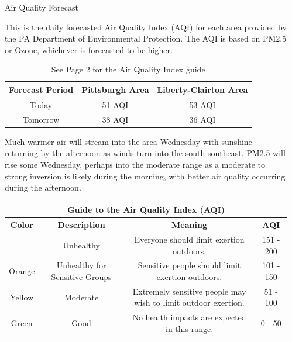 \documentclass[final]{beamer}
\newlength{\sepwidth}
\newlength{\colwidth}
\newcommand{\separatorcolumn}{\begin{column}{\sepwidth}\end{column}}
\begin{document}
\begin{frame}[t]
\begin{columns}[t]
\separatorcolumn

\begin{column}{\colwidth}

  \begin{block}{Air Quality Forecast}

    This is the daily forecasted Air Quality Index (AQI) for each area provided by the PA Department of Environmental Protection. The AQI is based on PM2.5 or Ozone, whichever is forecasted to be higher.

    \begin{table}
      \renewcommand{\arraystretch}{1.5}
      \centering
      \begin{tabular}{|c| c| c|}
        \hline
        \textbf{Forecast Period} & \textbf{Pittsburgh Area} & \textbf{Liberty-Clairton Area} \\
        \hline
        Today & 51 AQI & 53 AQI \\
        \hline
        Tomorrow & 38 AQI & 36 AQI \\
        \hline
      \end{tabular}
      \caption{See Page 2 for the Air Quality Index guide}
    \end{table}

    Much warmer air will stream into the area Wednesday with sunshine returning by the afternoon as winds turn into the south-southeast. PM2.5 will rise some Wednesday, perhaps into the moderate range as a moderate to strong inversion is likely during the morning, with better air quality occurring during the afternoon.
    
\usepackage[table]{xcolor,colortbl}

    \begin{table}
      \begin{adjustbox}{width=1\textwidth}
      \renewcommand{\arraystretch}{1.5}
      \centering
      \begin{tabular}{|c |c |c |c|}
      \hline
      \multicolumn{4}{|c|}{\textbf{Guide to the Air Quality Index (AQI)}} \\
      \hline
      \textbf{Color} & \textbf{Description} & \textbf{Meaning} & \textbf{AQI} \\
      \hline
       & Unhealthy & Everyone should limit exertion outdoors. & 151 - 200 \\
      Orange & Unhealthy for Sensitive Groups & Sensitive people should limit exertion outdoors. & 101 - 150 \\
      Yellow & Moderate & Extremely sensitive people may wish to limit outdoor exertion. & 51 - 100 \\
      Green & Good & No health impacts are expected in this range. & 0 - 50 \\
      \hline
      \end{tabular}
      \end{adjustbox}
    \end{table}


\end{block}
\end{column}
\end{columns}
\end{frame}
\end{document}
